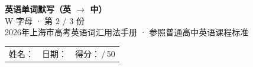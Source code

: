 \documentclass[10pt,a4paper]{article}
\begin{document}
\pagestyle{plain}

\begin{center}
{\LARGE\bfseries 英语单词默写（英 $\to$ 中）}\\[0.22em]
{\large W 字母 · 第 2 / 3 份}\\[0.18em]
{\small 2026年上海市高考英语词汇用法手册 · 参照普通高中英语课程标准}
\end{center}

\vspace{0.25em}
\noindent\begin{tabular}{@{}p{}@{}p{}@{}p{}@{}}
姓名：\underline{\hspace{2.0cm}} & 日期：\underline{\hspace{2.0cm}} & 得分：\underline{\hspace{1.3cm}}\,/\,50 \\
\end{tabular}

\vspace{0.3em}

\vspace{0.08em}
\end{document}
